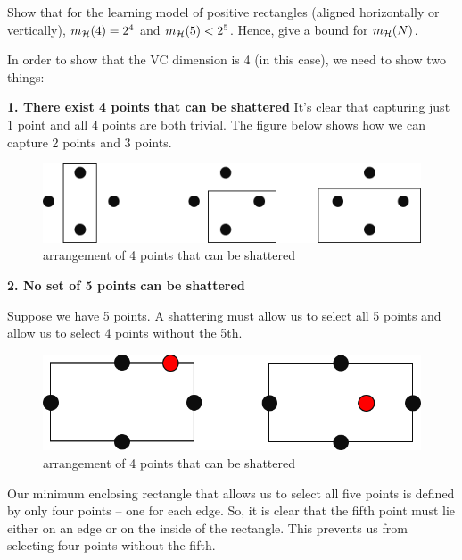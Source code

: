 \begin{enunciado}{2}
    Show that for the learning model of positive rectangles (aligned horizontally or vertically), $m_{\mathcal{H}}(4) = 2^4$ and $m_{\mathcal{H}}(5) < 2^5$. Hence, give a bound for $m_{\mathcal{H}}(N)$.
\end{enunciado}

In order to show that the VC dimension is 4 (in this case), we need to show two things:

\textbf{1. There exist 4 points that can be shattered}
It’s clear that capturing just 1 point and all 4 points are both trivial. The figure below shows how we
can capture 2 points and 3 points.

\begin{figure}[h]
	\centering
	\begin{minipage}{0.46\textwidth}
		\centering
		\includegraphics[width=\textwidth]{images/2-2-dvc4.png}
		\caption{arrangement of 4 points that can be shattered}
	\end{minipage}
\end{figure}

\textbf{2. No set of 5 points can be shattered}

Suppose we have 5 points. A shattering must allow us to select all 5 points and allow us to select 4
points without the 5th.

\begin{figure}[h]
	\centering
	\begin{minipage}{0.45\textwidth}
		\centering
		\includegraphics[width=\textwidth]{images/2-2-dvc5.png}
		\caption{arrangement of 4 points that can be shattered}
	\end{minipage}
\end{figure}

Our minimum enclosing rectangle that allows us to select all five points is defined by only four points
– one for each edge. So, it is clear that the fifth point must lie either on an edge or on the inside of
the rectangle. This prevents us from selecting four points without the fifth.